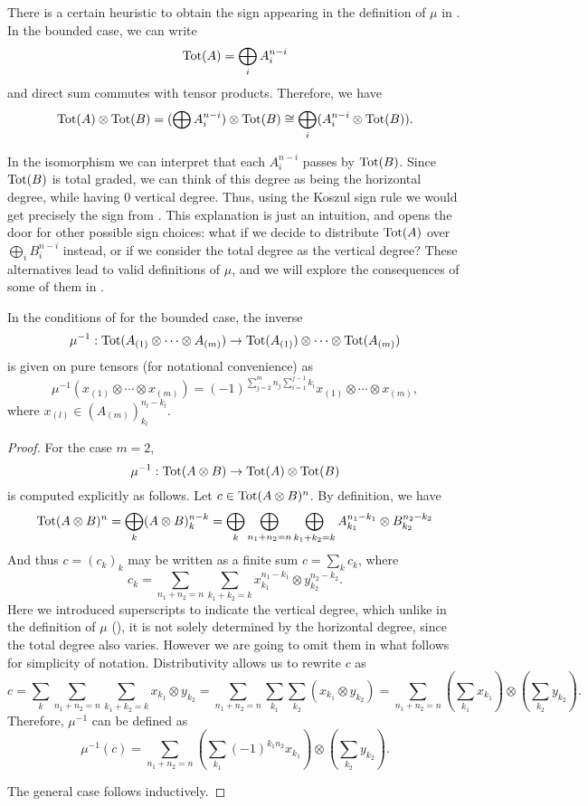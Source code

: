\documentclass[Thesis.tex]{subfiles}
\begin{document}
\begin{remark}\label{heuristic}
There is a certain heuristic to obtain the sign appearing in the definition of $\mu$ in . In the bounded case, we can write \[\mathrm{Tot}(A)=\bigoplus_i A_i^{n-i}\]
and direct sum commutes with tensor products. Therefore, we have
\[\mathrm{Tot}(A)\otimes\mathrm{Tot}(B)=(\bigoplus A_i^{n-i})\otimes \mathrm{Tot}(B)\cong \bigoplus_i  (A_i^{n-i}\otimes \mathrm{Tot}(B)).\]

In the isomorphism we can interpret that each $A_i^{n-i}$ passes by $\mathrm{Tot}(B)$. Since $\mathrm{Tot}(B)$ is total graded, we can think of this degree as being the horizontal degree, while having 0 vertical degree. Thus, using the Koszul sign rule we would get precisely the sign from . This explanation is just an intuition, and opens the door for other possible sign choices: what if we decide to distribute $\mathrm{Tot}(A)$ over $\bigoplus_i B_i^{n-i}$ instead, or if we consider the total degree as the vertical degree? These alternatives lead to valid definitions of $\mu$, and we will explore the consequences of some of them in .
\end{remark}

\begin{lem}\label{mui}
In the conditions of  for the bounded case, the inverse
\[\mu^{-1}:\mathrm{Tot}(A_{(1)}\otimes\cdots\otimes A_{(m)})\to \mathrm{Tot}(A_{(1)})\otimes\cdots\otimes \mathrm{Tot}(A_{(m)})\]
is given on pure tensors (for notational convenience) as
\begin{equation}\label{mu}
\mu^{-1}(x_{(1)}\otimes\cdots\otimes x_{(m)})=(-1)^{\sum_{j=2}^m n_j\sum_{i=1}^{j-1}k_i}x_{(1)}\otimes\cdots\otimes x_{(m)},
\end{equation}
where $x_{(l)}\in (A_{(m)})_{k_l}^{n_l-k_l}$.
\end{lem}
\begin{proof}
For the case $m=2$,
\[\mu^{-1}:\mathrm{Tot}(A\otimes B)\to \mathrm{Tot}(A)\otimes \mathrm{Tot}(B)\]
is computed explicitly as follows.
Let  $c\in\mathrm{Tot}(A\otimes B)^n$. By definition, we have
\[\mathrm{Tot}(A\otimes B)^n=\bigoplus_k (A\otimes B)^{n-k}_k=\bigoplus_k\bigoplus_{n_1+n_2=n}\bigoplus_{k_1+k_2=k}A_{k_1}^{n_1-k_1}\otimes B_{k_2}^{n_2-k_2}\]
And thus $c=(c_k)_k$ may be written as a finite sum $c=\sum_k c_k$, where 
\[c_k=\sum_{n_1+n_2=n}\sum_{k_1+k_2=k}x_{k_1}^{n_1-k_1}\otimes y_{k_2}^{n_2-k_2}.\]
Here we introduced superscripts to indicate the vertical degree, which unlike in the definition of $\mu$ (), it is not solely determined by the horizontal degree, since the total degree also varies. However we are going to omit them in what follows for simplicity of notation. Distributivity allows us to rewrite $c$ as
\[c=\sum_k \sum_{n_1+n_2=n}\sum_{k_1+k_2=k}x_{k_1}\otimes y_{k_2}=\sum_{n_1+n_2=n}\sum_{k_1}\sum_{k_2}(x_{k_1}\otimes y_{k_2})=\sum_{n_1+n_2=n}\left(\sum_{k_1}x_{k_1}\right)\otimes\left(\sum_{k_2}y_{k_2}\right).\]
Therefore, $\mu^{-1}$ can be defined as
\[\mu^{-1}(c)=\sum_{n_1+n_2=n}\left(\sum_{k_1}(-1)^{k_1n_2}x_{k_1}\right)\otimes\left(\sum_{k_2}y_{k_2}\right).\]

The general case follows inductively.
\end{proof}
\end{document}
